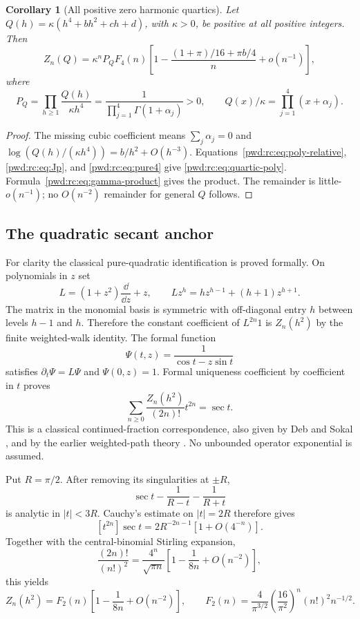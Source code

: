 \documentclass[11pt,letterpaper]{article}
\numberwithin{equation}{section}
\newtheorem{corollary}[theorem]{Corollary}
\theoremstyle{remark}\newtheorem{remark}[theorem]{Remark}
\begin{document}
\begin{corollary}[All positive zero harmonic quartics]\label{pwd:rc:cor:quartic}
Let $Q(h)=\kappa(h^4+b h^2+c h+d)$, with $\kappa>0$, be positive at all positive integers. Then
\begin{equation}\label{pwd:rc:eq:quartic-poly}
 Z_n(Q)=\kappa^nP_QF_4(n)
 \left[1-\frac{(1+\pi)/16+\pi b/4}{n}+o(n^{-1})\right],
\end{equation}
where
\[
 P_Q=\prod_{h\ge1}\frac{Q(h)}{\kappa h^4}
 =\frac1{\prod_{j=1}^4\Gamma(1+\alpha_j)}>0,
 \qquad Q(x)/\kappa=\prod_{j=1}^4(x+\alpha_j).
\]
\end{corollary}
\begin{proof}
The missing cubic coefficient means $\sum_j\alpha_j=0$ and
$\log(Q(h)/(\kappa h^4))=b/h^2+O(h^{-3})$.
Equations~\eqref{pwd:rc:eq:poly-relative}, \eqref{pwd:rc:eq:Jp}, and \eqref{pwd:rc:eq:pure4} give \eqref{pwd:rc:eq:quartic-poly}. Formula~\eqref{pwd:rc:eq:gamma-product} gives the product. The remainder is little-$o(n^{-1})$; no $O(n^{-2})$ remainder for general $Q$ follows.
\end{proof}

\subsection{The quadratic secant anchor}
For clarity the classical pure-quadratic identification is proved formally. On polynomials in $z$ set
\[
 L=(1+z^2)\frac{\dd}{\dd z}+z,
 \qquad Lz^h=h z^{h-1}+(h+1)z^{h+1}.
\]
The matrix in the monomial basis is symmetric with off-diagonal entry $h$ between levels $h-1$ and $h$. Therefore the constant coefficient of $L^{2n}1$ is $Z_n(h^2)$ by the finite weighted-walk identity. The formal function
\[
 \Psi(t,z)=\frac1{\cos t-z\sin t}
\]
satisfies $\partial_t\Psi=L\Psi$ and $\Psi(0,z)=1$. Formal uniqueness coefficient by coefficient in $t$ proves
\begin{equation}\label{pwd:rc:eq:secant}
 \sum_{n\ge0}\frac{Z_n(h^2)}{(2n)!}t^{2n}=\sec t.
\end{equation}
This is a classical continued-fraction correspondence, also given by Deb and Sokal \cite[Sec.~6.3, Eq.~(6.24a) at $\alpha=k=0$]{debsokal}, and by the earlier weighted-path theory \cite{flajolet}. No unbounded operator exponential is assumed.

Put $R=\pi/2$. After removing its singularities at $\pm R$,
\[
 \sec t-\frac1{R-t}-\frac1{R+t}
\]
is analytic in $|t|<3R$. Cauchy's estimate on $|t|=2R$ therefore gives
\[
 [t^{2n}]\sec t=2R^{-2n-1}\left[1+O(4^{-n})\right].
\]
Together with the central-binomial Stirling expansion,
\[
 \frac{(2n)!}{(n!)^2}=\frac{4^n}{\sqrt{\pi n}}
 \left[1-\frac1{8n}+O(n^{-2})\right],
\]
this yields
\begin{equation}\label{pwd:rc:eq:pure2}
 Z_n(h^2)=F_2(n)\left[1-\frac1{8n}+O(n^{-2})\right],\qquad
 F_2(n)=\frac4{\pi^{3/2}}\left(\frac{16}{\pi^2}\right)^n(n!)^2n^{-1/2}.
\end{equation}
\end{document}
